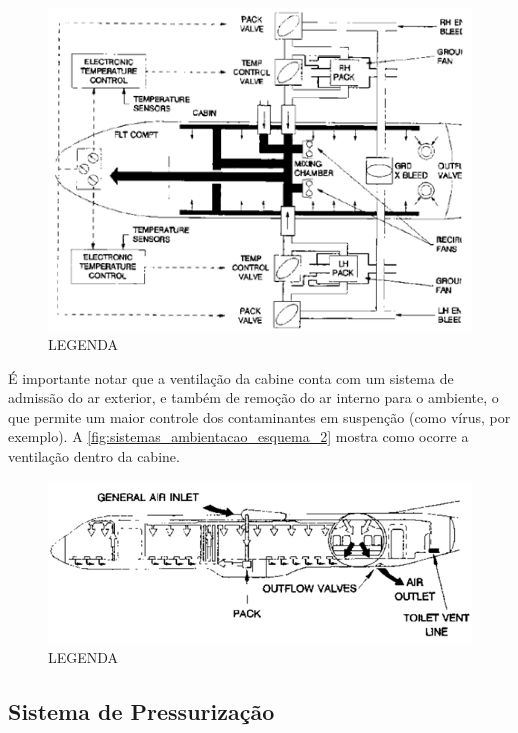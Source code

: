 \begin{figure}
\includegraphics[width=\textwidth]{images/parte3/sistemas_ambientacao_esquema.png}
\caption{LEGENDA}
\label{fig:sistemas_ambientacao_esquema}
\end{figure}

É importante notar que a ventilação da cabine conta com um sistema de admissão do ar exterior, e também de remoção do ar interno para o ambiente, o que permite um maior controle dos contaminantes em suspenção (como vírus, por exemplo).
A \autoref{fig:sistemas_ambientacao_esquema_2} mostra como ocorre a ventilação dentro da cabine.

\begin{figure}
\includegraphics[width=\textwidth]{images/parte3/sistemas_ambientacao_esquema_2.png}
\caption{LEGENDA}
\label{fig:sistemas_ambientacao_esquema_2}
\end{figure}

\subsection{Sistema de Pressurização}

